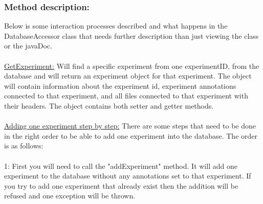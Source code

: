 \subsubsection{Method description:}
Below is some interaction processes described and what happens in the DatabaseAccessor class that needs further description than just viewing the class or the javaDoc.\\
\\
\underline{GetExperiment:} Will find a specific experiment from one experimentID, from the database and will return an experiment object for that experiment. The object will contain information about the experiment id, experiment annotations connected to that experiment, and all files connected to that experiment with their headers. The object contains both setter and getter methods. \\
\\
\underline{Adding one experiment step by step:}
There are some steps that need to be done in the right order to be able to add one experiment into the database. The order is as follows:\\
\\
1: First you will need to call the "addExperiment" method. It will add one experiment to the database without any annotations set to that experiment. If you try to add one experiment that already exist then the addition will be refused and one exception will be thrown.

